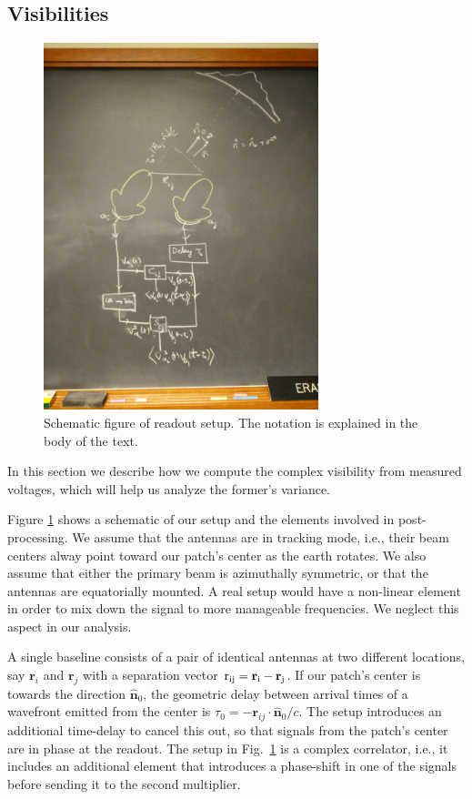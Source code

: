 \documentclass[11pt]{article}
\numberwithin{equation}{section}
\newcommand{\bt}[1]{\mathbf{#1}}
\begin{document}
\subsection{Visibilities}
\label{sec:visibilities}

\begin{figure}[htp]
  \centering
  \includegraphics[width=8cm]{schematic}
\caption{\label{fig:schematic} Schematic figure of readout setup. The notation is explained in the body of the text.}
\end{figure}

In this section we describe how we compute the complex visibility from measured voltages, which will help us analyze the former's variance. 

Figure \ref{fig:schematic} shows a schematic of our setup and the elements involved in post-processing. We assume that the antennas are in tracking mode, i.e., their beam centers alway point toward our patch's center as the earth rotates. We also assume that either the primary beam is azimuthally symmetric, or that the antennas are equatorially mounted. A real setup would have a non-linear element in order to mix down the signal to more manageable frequencies. We neglect this aspect in our analysis.

A single baseline consists of a pair of identical antennas at two different locations, say $\bt r_i$ and $\bt r_j$ with a separation vector $\rm r_{ij} = {\bt r}_i - {\bt r}_j$. If our patch's center is towards the direction $\hat{\bt n}_0$, the geometric delay between arrival times of a wavefront emitted from the center is $\tau_0 = - {\bt r}_{ij} \cdot \hat{\bt n}_0/c$. The setup introduces an additional time-delay to cancel this out, so that signals from the patch's center are in phase at the readout. The setup in Fig.~\ref{fig:schematic} is a complex correlator, i.e., it includes an additional element that introduces a phase-shift in one of the signals before sending it to the second multiplier.
\end{document}
